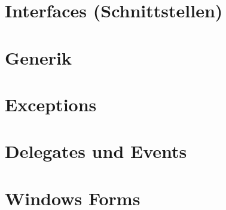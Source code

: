 \documentclass{scrreprt}
\begin{document}
\chapter{Interfaces (Schnittstellen)}
%

\chapter{Generik}
%

\chapter{Exceptions}
%

\chapter{Delegates und Events}


\chapter{Windows Forms}

\end{document}
